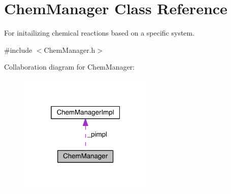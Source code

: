 \hypertarget{classChemManager}{\section{Chem\+Manager Class Reference}
\label{classChemManager}
}


For initailizing chemical reactions based on a specific system.  




{\ttfamily \#include $<$Chem\+Manager.\+h$>$}



Collaboration diagram for Chem\+Manager\+:\nopagebreak
\begin{figure}[H]
\begin{center}
\leavevmode
\includegraphics[width=181pt]{classChemManager__coll__graph}
\end{center}
\end{figure}
